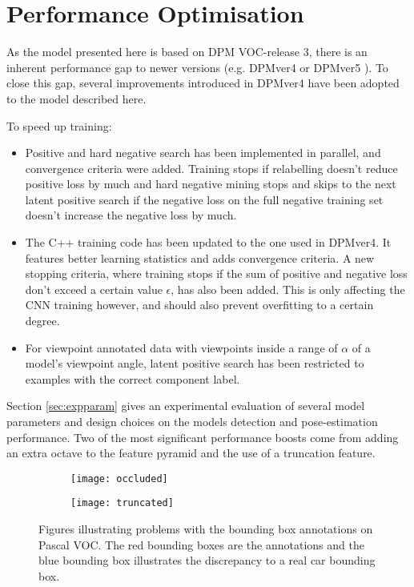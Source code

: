 \section{Performance Optimisation}
As the model presented here is based on DPM VOC-release 3, there is an inherent performance gap to newer versions (e.g. DPMver4 \cite{voc-release4} or DPMver5 \cite{voc-release5}). To close this gap, several improvements introduced in DPMver4 have been adopted to the model described here. 

To speed up training:
\begin{itemize}
  \item Positive and hard negative search has been implemented in parallel, and convergence criteria were added. Training stops if relabelling doesn't reduce positive loss by much and hard negative mining stops and skips to the next latent positive search if the negative loss on the full negative training set doesn't increase the negative loss by much.
  \item The C++ training code has been updated to the one used in DPMver4. It features better learning statistics and adds convergence criteria. A new stopping criteria, where training stops if the sum of positive and negative loss  don't exceed a certain value $\epsilon$, has also been added. This is only affecting the CNN training however, and should also prevent overfitting to a certain degree.
  \item For viewpoint annotated data with viewpoints inside a range of $\alpha$ of a model's viewpoint angle, latent positive search has been restricted to examples with the correct component label.
\end{itemize}

Section \ref{sec:expparam} gives an experimental evaluation of several model parameters and design choices on the models detection and pose-estimation performance. Two of the most significant performance boosts come from adding an extra octave to the feature pyramid and the use of a truncation feature.

\begin{figure}
\begin{center}
        \begin{subfigure}[b]{0.5\textwidth}
                \texttt{[image: occluded]}
        \end{subfigure}
        \begin{subfigure}[b]{0.4\textwidth}
                \texttt{[image: truncated]}
        \end{subfigure}
\caption{Figures illustrating problems with the bounding box annotations on Pascal VOC. The red bounding boxes are the annotations and the blue bounding box illustrates the discrepancy to a real car bounding box.}
\label{fig:trunc}
\end{center}
\end{figure}

